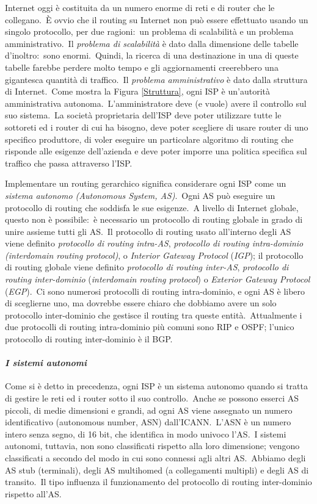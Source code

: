 Internet oggi è costituita da un numero enorme di reti e di router che le collegano.\
È ovvio che il routing su Internet non può essere effettuato usando un singolo protocollo, per due ragioni:\ un problema di scalabilità e un problema amministrativo.\
Il \emph{problema di scalabilità} è dato dalla dimensione delle tabelle d'inoltro:\ sono enormi.\
Quindi, la ricerca di una destinazione in una di queste tabelle farebbe perdere molto tempo e gli aggiornamenti creerebbero una gigantesca quantità di traffico.\
Il \emph{problema amministrativo} è dato dalla struttura di Internet.\
Come mostra la Figura \ref{Struttura}, ogni ISP è un'autorità amministrativa autonoma.\
L'amministratore deve (e vuole) avere il controllo sul suo sistema.\
La società proprietaria dell'ISP deve poter utilizzare tutte le sottoreti ed i router di cui ha bisogno, deve poter scegliere di usare router di uno specifico produttore, di voler eseguire un particolare algoritmo di routing che risponde alle esigenze dell'azienda e deve poter imporre una politica specifica sul traffico che passa attraverso l'ISP.

Implementare un routing gerarchico significa considerare ogni ISP come un \emph{sistema autonomo (Autonomous System, AS)}.\
Ogni AS può eseguire un protocollo di routing che soddisfa le sue esigenze.\
A livello di Internet globale, questo non è possibile:\ è necessario un protocollo di routing globale in grado di unire assieme tutti gli AS.\
Il protocollo di routing usato all'interno degli AS viene definito \emph{protocollo di routing intra-AS}, \emph{protocollo di routing intra-dominio} \emph{(interdomain routing protocol)}, o \emph{Interior Gateway Protocol} (\emph{IGP}); il protocollo di routing globale viene definito \emph{protocollo di routing inter-AS}, \emph{protocollo di routing inter-dominio} (\emph{interdomain routing protocol}) o \emph{Exterior Gateway Protocol} (\emph{EGP}).\
Ci sono numerosi protocolli di routing intra-dominio, e ogni AS è libero di sceglierne uno, ma dovrebbe essere chiaro che dobbiamo avere un solo protocollo inter-dominio che gestisce il routing tra queste entità.\
Attualmente i due protocolli di routing intra-dominio più comuni sono RIP e OSPF; l'unico protocollo di routing inter-dominio è il BGP.

\paragraph{\emph{I sistemi autonomi}}

Come si è detto in precedenza, ogni ISP è un sistema autonomo quando si tratta di gestire le reti ed i router sotto il suo controllo.\
Anche se possono esserci AS piccoli, di medie dimensioni e grandi, ad ogni AS viene assegnato un numero identificativo (autonomous number, ASN) dall'ICANN.\
L'ASN è un numero intero senza segno, di 16 bit, che identifica in modo univoco l'AS.\
I sistemi autonomi, tuttavia, non sono classificati rispetto alla loro dimensione; vengono classificati a secondo del modo in cui sono connessi agli altri AS.\
Abbiamo degli AS stub (terminali), degli AS multihomed (a collegamenti multipli) e degli AS di transito.\
Il tipo influenza il funzionamento del protocollo di routing inter-dominio rispetto all'AS.

